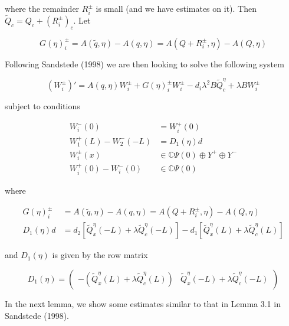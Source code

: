 \documentclass[12pt]{article}
\def\C{{\mathbb C}}
\begin{document}
where the remainder $R_i^\pm$ is small (and we have estimates on it). Then $\tilde{Q}_c = Q_c + (R_i^\pm)_c$. Let

\[
G(\eta)_i^\pm = A(\tilde{q},\eta) - A(q,\eta) = A(Q + R_i^\pm, \eta) - A(Q, \eta)
\]

Following Sandstede (1998) we are then looking to solve the following system

\begin{equation}\label{inteigQ}
(W_i^\pm)' = A(q, \eta)W_i^\pm + G(\eta)_i^\pm W_i^\pm - d_i \lambda^2 B \tilde{Q}^\eta_c + \lambda B W_i^\pm
\end{equation}  

subject to conditions

\begin{align*}
W_i^-(0) &= W_i^+(0) \\
W_1^+(L) - W_2^-(-L) &= D_1(\eta) d \\
W_i^\pm(x) &\in \C \Psi(0) \oplus Y^+ \oplus Y^- \\
W_i^+(0) - W_i^-(0) &\in \C \Psi(0) 
\end{align*}

where 

\begin{align*}
G(\eta)_i^\pm &= A(\tilde{q},\eta) - A(q,\eta) = A(Q + R_i^\pm, \eta) - A(Q, \eta) \\
D_1(\eta) d &= d_2 [ \tilde{Q}^\eta_x(-L) + \lambda \tilde{Q}^\eta_c(-L)] 
- d_1 [ \tilde{Q}^\eta_x(L) + \lambda \tilde{Q}^\eta_c(L)]
\end{align*}

and $D_1(\eta)$ is given by the row matrix 

\[
D_1(\eta) = \begin{pmatrix} -(\tilde{Q}^\eta_x(L) + \lambda \tilde{Q}^\eta_c(L)) & \tilde{Q}^\eta_x(-L) + \lambda \tilde{Q}^\eta_c(-L) \end{pmatrix}
\]

In the next lemma, we show some estimates similar to that in Lemma 3.1 in Sandstede (1998).
\end{document}
